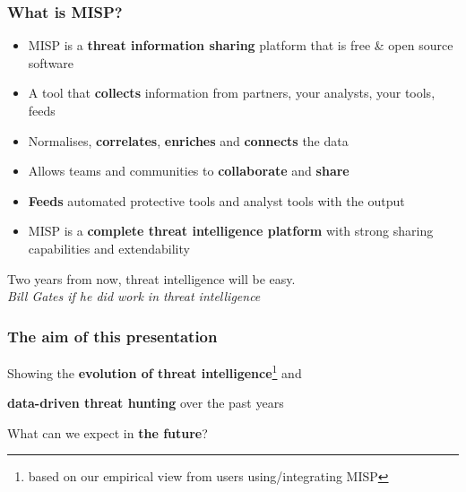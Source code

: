 
\begin{frame}
\titlepage
\end{frame}

\begin{frame}
\frametitle{What is MISP?}
\begin{itemize}
       \item MISP is a {\bf threat information sharing} platform that is free \& open source software
       \item A tool that {\bf collects} information from partners, your analysts, your tools, feeds
       \item Normalises, {\bf correlates}, {\bf enriches} and {\bf connects} the data
       \item Allows teams and communities to {\bf collaborate} and {\bf share}
       \item {\bf Feeds} automated protective tools and analyst tools with the output
       \item MISP is a {\bf complete threat intelligence platform} with strong sharing capabilities and extendability
\end{itemize}
\end{frame}

\begin{frame}[plain,c]
    \begin{center}
    {\Huge Two years from now, threat intelligence will be easy.\\}
        {\it Bill Gates if he did work in threat intelligence}
    \end{center}
\end{frame}


\begin{frame}
  \frametitle{The aim of this presentation}
  \begin{itemize}
      \item {\Large Showing the {\bf evolution of threat intelligence}\footnote{based on our empirical view from users using/integrating MISP} and 
      \item {\bf data-driven threat hunting} over the past years}
      \item {\Large What can we expect in {\bf the future}?}
  \end{itemize}
\end{frame}

